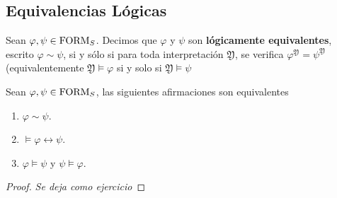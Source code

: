 \subsection{Equivalencias Lógicas}
\begin{definition}
Sean $\varphi, \psi \in \mbox{FORM}_{S}$. Decimos que $\varphi$ y $\psi$ son \textbf{lógicamente equivalentes}, escrito $\varphi \sim \psi$, si y sólo si para toda interpretación $\mathfrak{Y}$, se verifica $\varphi^{\mathfrak{Y}} = \psi^{\mathfrak{Y}}$ (equivalentemente $\mathfrak{Y} \models \varphi$ si y solo si $\mathfrak{Y} \models \psi$
\end{definition}

\begin{prop}
Sean $\varphi, \psi \in \mbox{FORM}_{S}$, las siguientes afirmaciones son equivalentes 
\begin{enumerate}
    \item $\varphi \sim \psi$.
    \item $\models \varphi \leftrightarrow \psi$.
    \item $\varphi \models \psi$ y $\psi \models \varphi$.
\end{enumerate}
\end{prop}
\begin{proof}
\textit{Se deja como ejercicio}
\end{proof}

